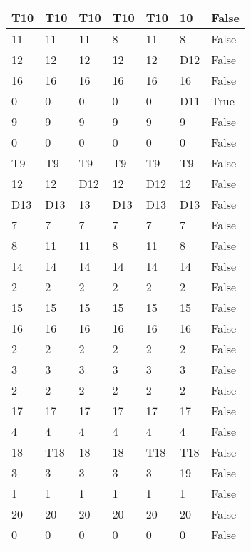 \begin{longtable}[htbp]{| p{} | p{} | p{}| p{}| p{}| p{}| p{}|}
\multicolumn{1}{|l|}{T10} & \multicolumn{1}{l|}{T10} & \multicolumn{1}{l|}{T10} & \multicolumn{1}{l|}{T10} & \multicolumn{1}{l|}{T10} & 10 & False \\ \hline
11 & 11 & 11 & 8 & 11 & 8 & False \\ \hline
12 & 12 & 12 & 12 & 12 & \multicolumn{1}{l|}{D12} & False \\ \hline
16 & 16 & 16 & 16 & 16 & 16 & False \\ \hline
0 & 0 & 0 & 0 & 0 & \multicolumn{1}{l|}{D11} & True \\ \hline
9 & 9 & 9 & 9 & 9 & 9 & False \\ \hline
0 & 0 & 0 & 0 & 0 & 0 & False \\ \hline
\multicolumn{1}{|l|}{T9} & \multicolumn{1}{l|}{T9} & \multicolumn{1}{l|}{T9} & \multicolumn{1}{l|}{T9} & \multicolumn{1}{l|}{T9} & \multicolumn{1}{l|}{T9} & False \\ \hline
12 & 12 & \multicolumn{1}{l|}{D12} & 12 & \multicolumn{1}{l|}{D12} & 12 & False \\ \hline
\multicolumn{1}{|l|}{D13} & \multicolumn{1}{l|}{D13} & 13 & \multicolumn{1}{l|}{D13} & \multicolumn{1}{l|}{D13} & \multicolumn{1}{l|}{D13} & False \\ \hline
7 & 7 & 7 & 7 & 7 & 7 & False \\ \hline
8 & 11 & 11 & 8 & 11 & 8 & False \\ \hline
14 & 14 & 14 & 14 & 14 & 14 & False \\ \hline
2 & 2 & 2 & 2 & 2 & 2 & False \\ \hline
15 & 15 & 15 & 15 & 15 & 15 & False \\ \hline
16 & 16 & 16 & 16 & 16 & 16 & False \\ \hline
2 & 2 & 2 & 2 & 2 & 2 & False \\ \hline
3 & 3 & 3 & 3 & 3 & 3 & False \\ \hline
2 & 2 & 2 & 2 & 2 & 2 & False \\ \hline
17 & 17 & 17 & 17 & 17 & 17 & False \\ \hline
4 & 4 & 4 & 4 & 4 & 4 & False \\ \hline
18 & \multicolumn{1}{l|}{T18} & 18 & 18 & \multicolumn{1}{l|}{T18} & \multicolumn{1}{l|}{T18} & False \\ \hline
3 & 3 & 3 & 3 & 3 & 19 & False \\ \hline
1 & 1 & 1 & 1 & 1 & 1 & False \\ \hline
20 & 20 & 20 & 20 & 20 & 20 & False \\ \hline
0 & 0 & 0 & 0 & 0 & 0 & False \\ \hline

\end{longtable}
